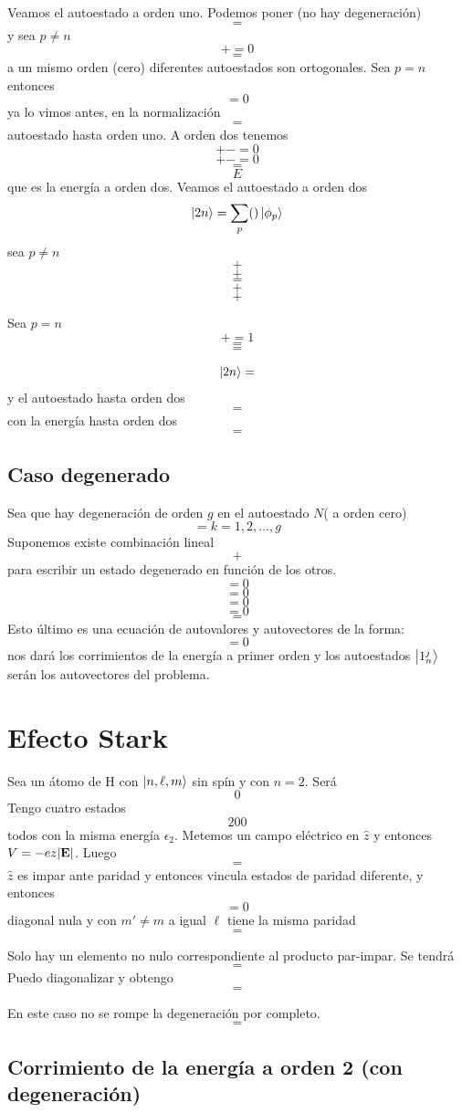 \documentclass[10pt,oneside]{CBFT_book}
\begin{document}
Veamos el autoestado a orden uno. Podemos poner (no hay degeneración)
\[
	=
\]
y sea $p\neq n$
\[
	+ = 0
\]
\[
	=
\]
a un mismo orden (cero) diferentes autoestados son ortogonales.
Sea $p=n$ entonces 
\[
	= 0 
\]
ya lo vimos antes, en la normalización
\[
	=
\]
autoestado hasta orden uno. A orden dos tenemos 
\[
	+ - = 0
\]
\[
	+ - = 0
\]
\[
	=
\]
\[
	E
\]
que es la energía a orden dos.
Veamos el autoestado a orden dos 
\[
	\Ket{2n} = \sum_p ()\Ket{\phi_p}
\]
sea $p\neq n$ 
\[
	+
\]
\[
	+
\]
\[
	=
\]
\[
	+
\]
\[
	+
\]

Sea $p=n$
\[
	+ = 1
\]
\[
	=
\]
\[
	=
\]

\[
	\Ket{2n} =
\]
y el autoestado hasta orden dos
\[
	=
\]
con la energía hasta orden dos 
\[
	=
\]

\subsection{Caso degenerado}

Sea que hay degeneración de orden $g$ en el autoestado $N$( a orden cero)
\[
	= k=1,2,...,g
\]
Suponemos existe combinación lineal 
\[
	+
\]
para escribir un estado degenerado en función de los otros.
\[
	= 0
\]
\[
	= 0
\]
\[
	=0
\]
\[
	=0
\]
\[
	=
\]
Esto último es una ecuación de autovalores y autovectores de la forma:
\[
	= 0 
\]
nos dará los corrimientos de la energía a primer orden  y los autoestados $\Ket{1_n^j}$ serán los 
autovectores del problema.

\section{Efecto Stark}

Sea un átomo de H con $\Ket{n,\ell,m}$ sin spín y con $n=2$. Será 
\[
	0
\]
Tengo cuatro estados 
\[
	2 0 0 
\]
todos con la misma energía $\epsilon_2$.
Metemos un campo eléctrico en $\hat{z}$ y entonces $V=-ez|\vb{E}|$. Luego 
\[
	=
\]
$\hat{z}$ es impar ante paridad y entonces vincula estados de paridad diferente,
y entonces 
\[
	= 0 
\]
diagonal nula y con $m'\neq m$ a igual $\ell$ tiene la misma paridad
\[
	=
\]

Solo hay un elemento no nulo correspondiente al producto par-impar.
Se tendrá 
\[
	=
\]
Puedo diagonalizar y obtengo 
\[
	=
\]

En este caso no se rompe la degeneración por completo.
\[
	=
\]


\subsection{Corrimiento de la energía a orden 2 (con degeneración)}
\end{document}
